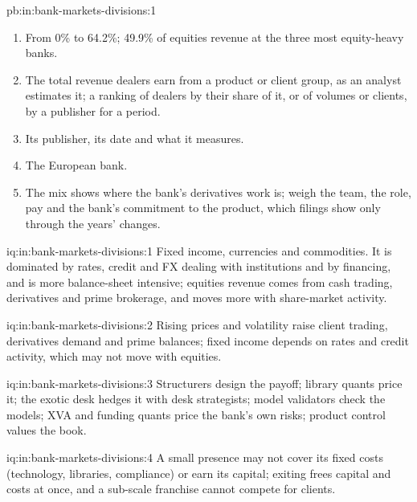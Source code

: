 \begin{solution}{pb:in:bank-markets-divisions:1}
\begin{enumerate}
\item From 0\% to 64.2\%; 49.9\% of equities revenue at the three most equity-heavy banks.
\item The total revenue dealers earn from a product or client group, as an analyst estimates it; a ranking of dealers by
their share of it, or of volumes or clients, by a publisher for a period.
\item Its publisher, its date and what it measures.
\item The European bank.
\item The mix shows where the bank's derivatives work is; weigh the team, the role, pay and the bank's commitment to
the product, which filings show only through the years' changes.
\end{enumerate}
\end{solution}

\begin{solution}{iq:in:bank-markets-divisions:1}
Fixed income, currencies and commodities. It is dominated by rates, credit and FX dealing with institutions and by
financing, and is more balance-sheet intensive; equities revenue comes from cash trading, derivatives and prime
brokerage, and moves more with share-market activity.
\end{solution}

\begin{solution}{iq:in:bank-markets-divisions:2}
Rising prices and volatility raise client trading, derivatives demand and prime balances; fixed income depends on rates
and credit activity, which may not move with equities.
\end{solution}

\begin{solution}{iq:in:bank-markets-divisions:3}
Structurers design the payoff; library quants price it; the exotic desk hedges it with desk strategists; model
validators check the models; XVA and funding quants price the bank's own risks; product control values the book.
\end{solution}

\begin{solution}{iq:in:bank-markets-divisions:4}
A small presence may not cover its fixed costs (technology, libraries, compliance) or earn its capital; exiting frees
capital and costs at once, and a sub-scale franchise cannot compete for clients.
\end{solution}

